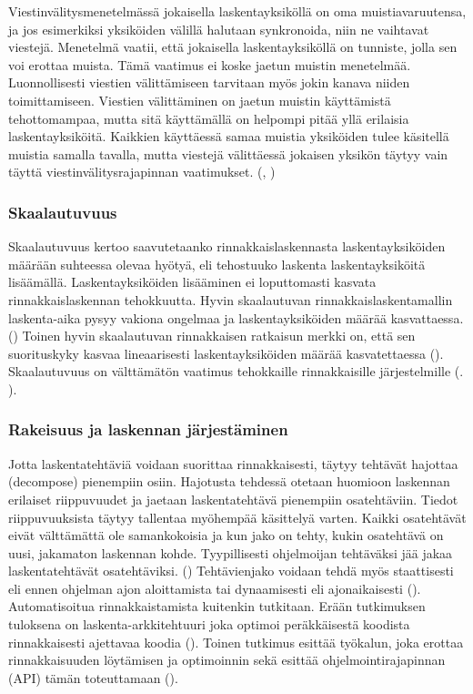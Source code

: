 Viestinvälitysmenetelmässä jokaisella
laskentayksiköllä on oma muistiavaruutensa, ja jos esimerkiksi  yksiköiden
välillä halutaan synkronoida, niin ne vaihtavat viestejä. Menetelmä vaatii,
että jokaisella laskentayksiköllä on tunniste, jolla sen voi erottaa muista.
Tämä vaatimus ei koske jaetun muistin menetelmää. Luonnollisesti viestien
välittämiseen tarvitaan myös jokin kanava niiden toimittamiseen. Viestien
välittäminen on jaetun muistin käyttämistä tehottomampaa, mutta sitä
käyttämällä on helpompi pitää yllä erilaisia laskentayksiköitä. Kaikkien
käyttäessä samaa muistia yksiköiden tulee käsitellä muistia samalla tavalla,
mutta viestejä välittäessä jokaisen yksikön täytyy vain täyttä
viestinvälitysrajapinnan vaatimukset. (\citealt{intro}, \citealt{rauber})

\subsubsection{Skaalautuvuus}

Skaalautuvuus kertoo saavutetaanko rinnakkaislaskennasta laskentayksiköiden määrään
suhteessa olevaa hyötyä, eli tehostuuko laskenta laskentayksiköitä lisäämällä.
Laskentayksiköiden lisääminen ei loputtomasti kasvata rinnakkaislaskennan
tehokkuutta. Hyvin skaalautuvan rinnakkaislaskentamallin laskenta-aika pysyy
vakiona ongelmaa ja laskentayksiköiden määrää kasvattaessa. (\citealt{rauber})
Toinen hyvin skaalautuvan rinnakkaisen ratkaisun merkki on, että sen suorituskyky
kasvaa lineaarisesti laskentayksiköiden määrää kasvatettaessa (\citealt{intro}).
Skaalautuvuus on välttämätön vaatimus tehokkaille rinnakkaisille järjestelmille
(\citealt{intro}. \citealt{rauber}).

\subsubsection{Rakeisuus ja laskennan järjestäminen}

Jotta laskentatehtäviä voidaan suorittaa rinnakkaisesti, täytyy tehtävät
hajottaa (decompose) pienempiin osiin. Hajotusta tehdessä otetaan huomioon laskennan
erilaiset riippuvuudet ja jaetaan laskentatehtävä pienempiin osatehtäviin.
Tiedot riippuvuuksista täytyy tallentaa myöhempää käsittelyä varten.
Kaikki osatehtävät eivät välttämättä ole samankokoisia ja kun jako on tehty,
kukin osatehtävä on uusi, jakamaton laskennan kohde. Tyypillisesti ohjelmoijan
tehtäväksi jää jakaa laskentatehtävät osatehtäviksi. (\citealt{intro})
Tehtävienjako voidaan tehdä myös staattisesti eli ennen ohjelman ajon
aloittamista tai dynaamisesti eli ajonaikaisesti (\citealt{rauber}).
Automatisoitua rinnakkaistamista kuitenkin tutkitaan. Erään tutkimuksen
tuloksena on laskenta-arkkitehtuuri joka optimoi peräkkäisestä koodista
rinnakkaisesti ajettavaa koodia (\citealt{apopei}). Toinen tutkimus esittää
työkalun, joka erottaa rinnakkaisuuden löytämisen ja optimoinnin sekä esittää
ohjelmointirajapinnan (API) tämän toteuttamaan (\citealt{dope}).

